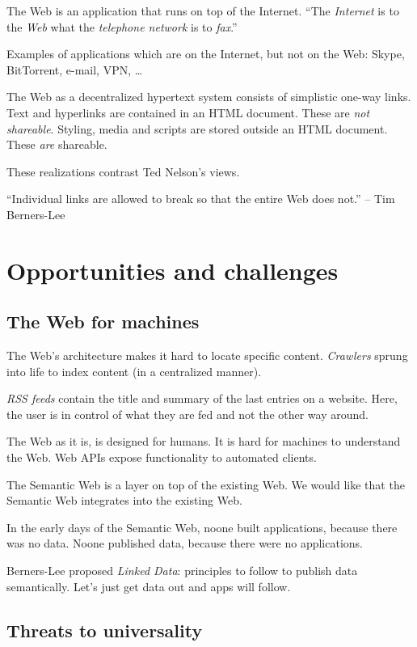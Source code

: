 \documentclass{report}
\begin{document}
The Web is an application that runs on top of the Internet.
``The \emph{Internet} is to the \emph{Web}
what the \emph{telephone network} is to \emph{fax}.''

Examples of applications which are on the Internet,
but not on the Web:
Skype, BitTorrent, e-mail, VPN, \dots

The Web as a decentralized hypertext system
consists of simplistic one-way links.
Text and hyperlinks are contained in an HTML document.
These are \emph{not shareable}.
Styling, media and scripts are stored outside an HTML document.
These \emph{are} shareable.

These realizations contrast Ted Nelson's views.

``Individual links are allowed to break
so that the entire Web does not.'' -- Tim Berners-Lee

\section{Opportunities and challenges}

\subsection{The Web for machines}

The Web's architecture makes it hard
to locate specific content.
\textit{Crawlers} sprung into life
to index content (in a centralized manner).

\textit{RSS feeds} contain the title and summary
of the last entries on a website.
Here, the user is in control of what they are fed
and not the other way around.

The Web as it is, is designed for humans.
It is hard for machines to understand the Web.
Web APIs expose functionality to automated clients.

The Semantic Web is a layer
on top of the existing Web.
We would like that the Semantic Web
integrates into the existing Web.

In the early days of the Semantic Web,
noone built applications, because there was no data.
Noone published data, because there were no applications.

Berners-Lee proposed \textit{Linked Data}:
principles to follow to publish data semantically.
Let's just get data out and apps will follow.

\subsection{Threats to universality}
\end{document}
